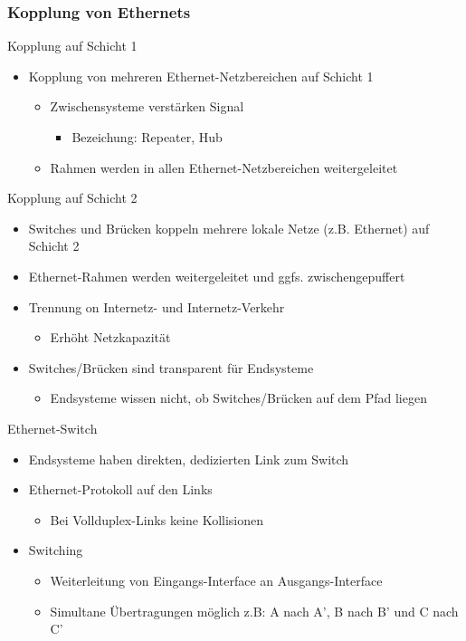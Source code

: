     \subsubsection{Kopplung von Ethernets}
      Kopplung auf Schicht 1
      \begin{itemize}
        \item Kopplung von mehreren Ethernet-Netzbereichen auf Schicht 1
          \begin{itemize}
            \item Zwischensysteme verstärken Signal
              \begin{itemize}
                \item Bezeichung: Repeater, Hub
              \end{itemize}
            \item Rahmen werden in allen Ethernet-Netzbereichen weitergeleitet
          \end{itemize}
      \end{itemize}
      Kopplung auf Schicht 2
      \begin{itemize}
        \item Switches und Brücken koppeln mehrere lokale Netze (z.B. Ethernet) auf Schicht 2
        \item Ethernet-Rahmen werden weitergeleitet und ggfs. zwischengepuffert
        \item Trennung on Internetz- und Internetz-Verkehr
          \begin{itemize}
            \item Erhöht Netzkapazität
          \end{itemize}
        \item Switches/Brücken sind transparent für Endsysteme
          \begin{itemize}
            \item Endsysteme wissen nicht, ob Switches/Brücken auf dem Pfad liegen
          \end{itemize}
      \end{itemize}
      Ethernet-Switch
      \begin{itemize}
        \item Endsysteme haben direkten, dedizierten Link zum Switch
        \item Ethernet-Protokoll auf den Links
          \begin{itemize}
            \item Bei Vollduplex-Links keine Kollisionen
          \end{itemize}
        \item Switching
          \begin{itemize}
            \item Weiterleitung von Eingangs-Interface an Ausgangs-Interface
            \item Simultane Übertragungen möglich z.B: A nach A', B nach B' und C nach C'
          \end{itemize}
      \end{itemize}
